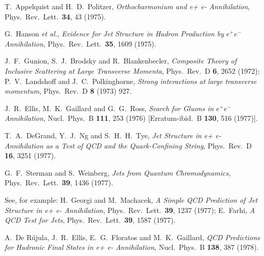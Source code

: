 \documentclass{ws-rv975x65}[12pt]
\begin{document}
\begin{thebibliography}{9}
T.~Appelquist and H.~D.~Politzer,
{\it Orthocharmonium and e+ e- Annihilation},
  Phys.\ Rev.\ Lett.\  {\bf 34}, 43 (1975).

G.~Hanson {\it et al.},
{\it Evidence for Jet Structure in Hadron Production by $e^+ e^-$ Annihilation},
  Phys.\ Rev.\ Lett.\  {\bf 35}, 1609 (1975).

J.~F.~Gunion, S.~J.~Brodsky and R.~Blankenbecler,
{\it Composite Theory of Inclusive Scattering at Large Transverse Momenta},
  Phys.\ Rev.\ D {\bf 6}, 2652 (1972);
P.~V.~Landshoff and J.~C.~Polkinghorne,
{\it Strong interactions at large transverse momentum},
  Phys.\ Rev.\ D {\bf 8} (1973) 927.
  
J.~R.~Ellis, M.~K.~Gaillard and G.~G.~Ross,
{\it Search for Gluons in $e^+ e^-$ Annihilation},
  Nucl.\ Phys.\ B {\bf 111}, 253 (1976)
  [Erratum-ibid.\ B {\bf 130}, 516 (1977)].

T.~A.~DeGrand, Y.~J.~Ng and S.~H.~H.~Tye,
{\it Jet Structure in e+ e- Annihilation as a Test of QCD and the Quark-Confining String},
  Phys.\ Rev.\ D {\bf 16}, 3251 (1977).

G.~F.~Sterman and S.~Weinberg,
{\it Jets from Quantum Chromodynamics},
  Phys.\ Rev.\ Lett.\  {\bf 39}, 1436 (1977).

See, for example:
H.~Georgi and M.~Machacek,
{\it A Simple QCD Prediction of Jet Structure in e+ e- Annihilation},
  Phys.\ Rev.\ Lett.\  {\bf 39}, 1237 (1977);
E.~Farhi,
{\it A QCD Test for Jets},
  Phys.\ Rev.\ Lett.\  {\bf 39}, 1587 (1977).
  
A.~De R{\' u}jula, J.~R.~Ellis, E.~G.~Floratos and M.~K.~Gaillard,
{\it QCD Predictions for Hadronic Final States in e+ e- Annihilation},
  Nucl.\ Phys.\ B {\bf 138}, 387 (1978).


\end{thebibliography}
\end{document}
